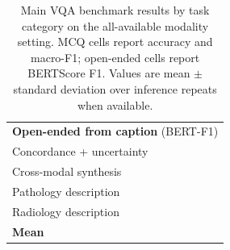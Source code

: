 \begin{table}[t]
\begin{tabular}{lc}
\multicolumn{2}{l}{\textbf{Open-ended from caption} \textnormal{(BERT-F1)}} \\
Concordance + uncertainty & \bertcell{--} \\
Cross-modal synthesis & \bertcell{--} \\
Pathology description & \bertcell{--} \\
Radiology description & \bertcell{--} \\
\rowcolor[HTML]{F8FAFC}
\textbf{Mean} & \bertcell{--} \\
\bottomrule
\end{tabular}
\caption{Main VQA benchmark results by task category on the all-available modality setting. MCQ cells report accuracy and macro-F1; open-ended cells report BERTScore F1. Values are mean $\pm$ standard deviation over inference repeats when available.}
\label{tab:main_result}
\end{table}
